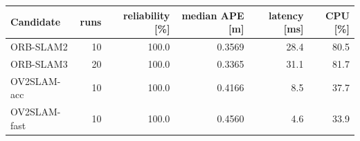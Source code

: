 \begin{tabular}{lrrrrr}
\toprule
Candidate & runs & reliability [\%] & median APE [m] & latency [ms] & CPU [\%] \\
\midrule
ORB-SLAM2 & 10 & 100.0 & 0.3569 & 28.4 & 80.5 \\
ORB-SLAM3 & 20 & 100.0 & 0.3365 & 31.1 & 81.7 \\
OV2SLAM-acc & 10 & 100.0 & 0.4166 & 8.5 & 37.7 \\
OV2SLAM-fast & 10 & 100.0 & 0.4560 & 4.6 & 33.9 \\
\bottomrule
\end{tabular}
